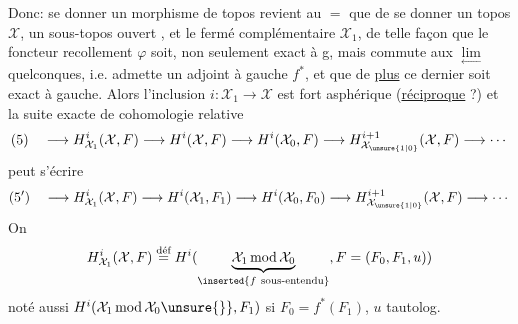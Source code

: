 Donc: se donner un morphisme de topos  revient au $=$ que de se donner un topos $\mathcal X$,  un sous-topos ouvert , et le fermé complémentaire $\mathcal X_1$, de telle façon que le foncteur recollement $\varphi$ soit, non seulement exact à g, mais commute aux $\underset{\leftarrow}{\lim}$ quelconques,  i.e. admette un adjoint à gauche $f^*$, et que de \uline{plus} ce dernier soit exact à gauche. Alors l'inclusion $i:\mathcal X_1\longrightarrow\mathcal X$ est fort asphérique (\uline{réciproque} ?) et la suite exacte de cohomologie relative
\[
(5)\quad\longrightarrow H^i_{\mathcal X_1}(\mathcal X,F)\longrightarrow H^i(\mathcal X,F)\longrightarrow H^i(\mathcal X_0,F)\longrightarrow H^{i+1}_{\mathcal X_{\unsure{1|0}}}(\mathcal X,F)\longrightarrow\cdots
\]
peut s'écrire
\[
(5')\quad\longrightarrow H^i_{\mathcal X_1}(\mathcal X,F)\longrightarrow H^i(\mathcal X_1,F_1)\longrightarrow H^i(\mathcal X_0,F_0)\longrightarrow H^{i+1}_{\mathcal X_{\unsure{1|0}}}(\mathcal X,F)\longrightarrow\cdots
\]
On 
\[
H^i_{\mathcal X_1}(\mathcal X,F)\overset{\text{déf}}{=}H^i(\underbrace{\mathcal X_1\operatorname{mod}\mathcal X_0}_{\inserted{f\ \text{sous-entendu}}},F=(F_0,F_1,u))
\]
noté aussi  $H^i(\mathcal X_1\operatorname{mod}\mathcal X_0\unsure{\}},F_1)$ si $F_0=f^*(F_1)$, $u$ tautolog.
